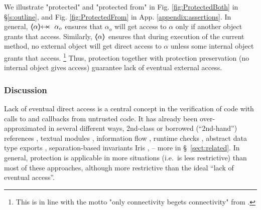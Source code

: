  We illustrate "protected" and "protected from" in Fig.  \ref{fig:ProtectedBoth} in \S \ref{s:outline},
and    Fig.  \ref{fig:ProtectedFrom} in App. \ref{appendix:assertions}.
%
In general,  $\protectedFrom{{\alpha}} {{\alpha_{o}}}$ ensures that $\alpha_o$ will get access to $\alpha$ only if another object 
 grants that access.
Similarly, $\langle\!\!\langle \alpha \rangle\!\!\rangle$ ensures that during execution of the current method, no external object will get direct access to $\alpha$ unless some internal object grants that access.
\footnote{This is in line with the motto "only connectivity begets connectivity" from \cite{MillerPhD}.}
Thus, protection together with protection preservation  (\ie no internal object gives access) guarantee
lack of eventual external access.  

 
 
 \subsubsection*{Discussion} 
Lack of  eventual 
direct access is a central concept in the verification of code with calls to and callbacks  from untrusted code.
It has already been over-approximated in several different ways, \eg
2nd-class \cite{rompf-second-class-oopsla2016,rompf-dont-pop-second-class-ecoop2022}
or borrowed (``2nd-hand'') references
\cite{boyland-promises-icse1998,boyland-aliasburying-spe2001},
 textual modules \cite{OOPSLA22},
information flow \cite{ddd}, runtime
checks \cite{secure-io-fstar-popl2024},
abstract data type exports \cite{vmsl-pldi2023},
  separation-based invariants 
Iris \cite{iris-wasm-pldi2023,cerise-jacm2024},
-- more in  \S~\ref{sect:related}.
In general, protection is applicable in more situations (i.e.\ is less
restrictive) than most of these approaches,
 although more restrictive than the ideal ``lack of eventual access''. 





